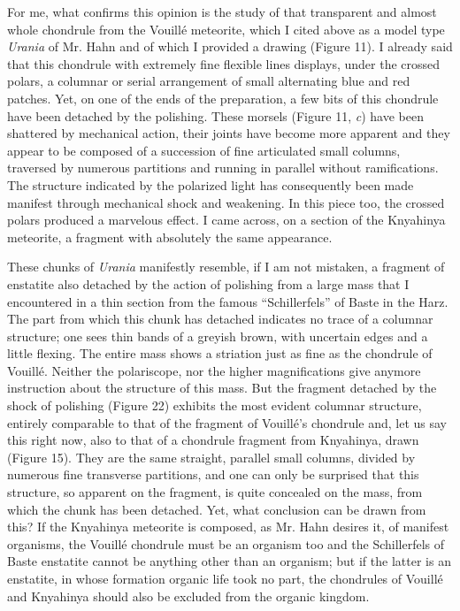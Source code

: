 \documentclass[a4paper, 12pt, oneside]{article}
\begin{document}
For me, what confirms this opinion is the study of that transparent and almost whole chondrule from the Vouillé meteorite, which I cited above as a model type \emph{Urania} of Mr. Hahn and of which I provided a drawing (Figure 11). I already said that this chondrule with extremely fine flexible lines displays, under the crossed polars, a columnar or serial arrangement of small alternating blue and red patches. Yet, on one of the ends of the preparation, a few bits of this chondrule have been detached by the polishing. These morsels (Figure 11, \emph{c}) have been shattered by mechanical action, their joints have become more apparent and they appear to be composed of a succession of fine articulated small columns, traversed by numerous partitions and running in parallel without ramifications. The structure indicated by the polarized light has consequently been made manifest through mechanical shock and weakening. In this piece too, the crossed polars produced a marvelous effect. I came across, on a section of the Knyahinya meteorite, a fragment with absolutely the same appearance.

These chunks of \emph{Urania} manifestly resemble, if I am not mistaken, a fragment of enstatite also detached by the action of polishing from a large mass that I encountered in a thin section from the famous ``Schillerfels'' of Baste in the Harz. The part from which this chunk has detached indicates no trace of a columnar structure; one sees thin bands of a greyish brown, with uncertain edges and a little flexing. The entire mass shows a striation just as fine as the chondrule of Vouillé. Neither the polariscope, nor the higher magnifications give anymore instruction about the structure of this mass. But the fragment detached by the shock of polishing (Figure 22) exhibits the most evident columnar structure, entirely comparable to that of the fragment of Vouillé's chondrule and, let us say this right now, also to that of a chondrule fragment from Knyahinya, drawn (Figure 15). They are the same straight, parallel small columns, divided by numerous fine transverse partitions, and one can only be surprised that this structure, so apparent on the fragment, is quite concealed on the mass, from which the chunk has been detached. Yet, what conclusion can be drawn from this? If the Knyahinya meteorite is composed, as Mr. Hahn desires it, of manifest organisms, the Vouillé chondrule must be an organism too and the Schillerfels of Baste enstatite cannot be anything other than an organism; but if the latter is an enstatite, in whose formation organic life took no part, the chondrules of Vouillé and Knyahinya should also be excluded from the organic kingdom.
\end{document}

